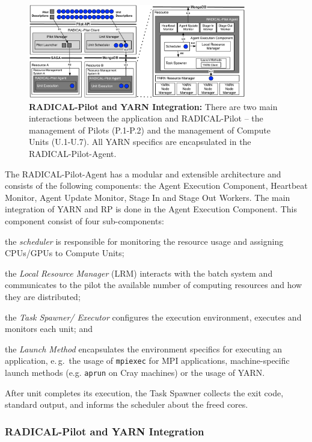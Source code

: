\begin{figure}
    \centering
    \includegraphics[width=0.85\textwidth]{figures/data_analytics_hpc/hpc_hadoop/rp-architecture-yarn.pdf}
    \caption{\textbf{RADICAL-Pilot and YARN Integration:} There are two main interactions between the application and RADICAL-Pilot -- the management of Pilots (P.1-P.2) and the management of Compute Units (U.1-U.7).  All YARN specifics are encapsulated in the RADICAL-Pilot-Agent.\label{fig:comp_rp_arch}}
\end{figure}

The RADICAL-Pilot-Agent has a modular and extensible architecture and consists of the following components: the Agent Execution Component, Heartbeat Monitor, Agent Update Monitor, Stage In and Stage Out Workers.
The main integration of YARN and RP is done in the Agent Execution Component.
This component consist of four sub-components:
\begin{inparaenum}[a)]
    \item the \textit{scheduler} is responsible for monitoring the resource usage and assigning CPUs/GPUs to Compute Units;
    \item the \textit{Local Resource Manager} (LRM) interacts with the batch system and communicates to the pilot the available number of computing resources and how they are distributed;
    \item the \textit{Task Spawner/ Executor} configures the execution environment, executes and monitors each unit; and
    \item the \textit{Launch Method} encapsulates the environment specifics for executing an application, e.\,g.\ the usage of \texttt{mpiexec} for MPI applications, machine-specific launch methods (e.g. \texttt{aprun} on Cray machines) or the usage of YARN.
\end{inparaenum}
After unit completes its execution, the Task Spawner collects the exit code, standard output, and informs the scheduler about the freed cores.

\subsubsection*{RADICAL-Pilot and YARN Integration}
\label{sssec:rp-yarn}

